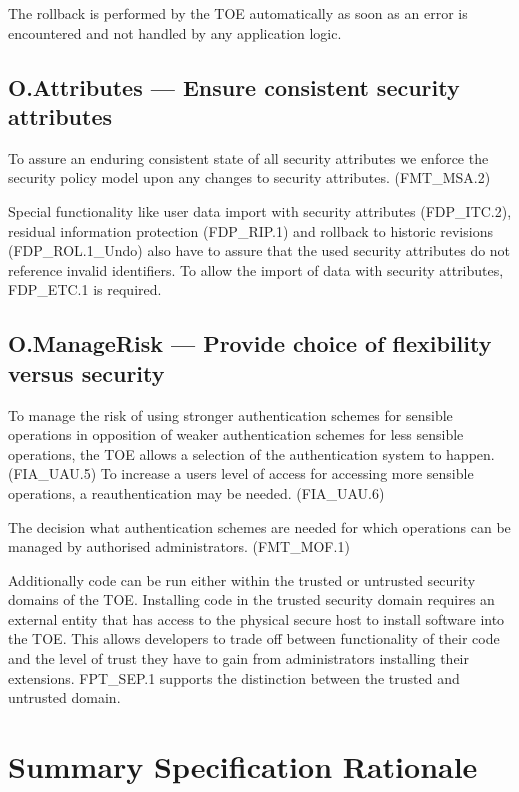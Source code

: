 \documentclass[12pt,english]{scrbook}
\begin{document}
    The rollback is performed by the TOE automatically as soon as an error is
    encountered and not handled by any application logic.

\subsection{O.Attributes --- Ensure consistent security attributes}

    To assure an enduring consistent state of all security attributes we
    enforce the security policy model upon any changes to security attributes.
    (FMT\_MSA.2)

    Special functionality like user data import with security attributes
    (FDP\_ITC.2), residual information protection (FDP\_RIP.1) and rollback to
    historic revisions (FDP\_ROL.1\_Undo) also have to assure that the used
    security attributes do not reference invalid identifiers. To allow the
    import of data with security attributes, FDP\_ETC.1 is required.
    
\subsection{O.ManageRisk --- Provide choice of flexibility versus security}

    To manage the risk of using stronger authentication schemes for sensible
    operations in opposition of weaker authentication schemes for less sensible
    operations, the TOE allows a selection of the authentication system to
    happen. (FIA\_UAU.5) To increase a users level of access for accessing more
    sensible operations, a reauthentication may be needed. (FIA\_UAU.6)
    
    The decision what authentication schemes are needed for which operations
    can be managed by authorised administrators. (FMT\_MOF.1)

    Additionally code can be run either within the trusted or untrusted
    security domains of the TOE. Installing code in the trusted security domain
    requires an external entity that has access to the physical secure host to
    install software into the TOE. This allows developers to trade off between
    functionality of their code and the level of trust they have to gain from
    administrators installing their extensions. FPT\_SEP.1 supports the
    distinction between the trusted and untrusted domain.

\section{Summary Specification Rationale}
\end{document}
